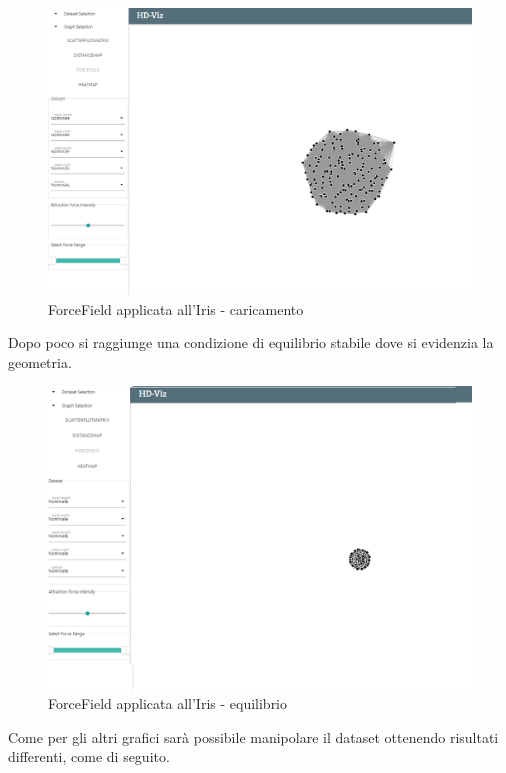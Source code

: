 \documentclass[../manuale_utente.tex]{subfiles}
\begin{document}
\begin{figure}[H]
	\centering
	\includegraphics[width=18cm]{img/ff/ff_iris_0_1}
	\caption{ForceField applicata all'Iris - caricamento}
\end{figure}

Dopo poco si raggiunge una condizione di equilibrio stabile dove si evidenzia la geometria. 

\begin{figure}[H]
	\centering
	\includegraphics[width=18cm]{img/ff/ff_iris_0_2}
	\caption{ForceField applicata all'Iris - equilibrio}
\end{figure}


Come per gli altri grafici sarà possibile manipolare il dataset ottenendo risultati differenti, come di seguito. 
\end{document}
